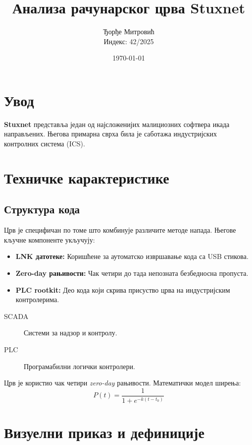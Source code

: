\documentclass[12pt]{article}
\title{Анализа рачунарског црва Stuxnet}
\author{Ђорђе Митровић \\ Индекс: 42/2025}
\date{\today}
\begin{document}
\maketitle

\tableofcontents
\newpage

\section{Увод}
\textbf{Stuxnet} представља један од најсложенијих малициозних софтвера икада направљених. Његова примарна сврха била је саботажа индустријских контролних система (ICS). 


\section{Техничке карактеристике}
\subsection{Структура кода}

Црв је специфичан по томе што комбинује различите методе напада. Његове кључне компоненте укључују:

\begin{itemize}
    \item \textbf{LNK датотеке:} Коришћене за аутоматско извршавање кода са USB стикова.
    \item \textbf{Zero-day рањивости:} Чак четири до тада непозната безбедносна пропуста.
    \item \textbf{PLC rootkit:} Део кода који скрива присуство црва на индустријским контролерима.
\end{itemize}
\begin{description}
    \item[SCADA] Системи за надзор и контролу.
    \item[PLC] Програмабилни логички контролери.
\end{description}
Црв је користио чак четири \textit{zero-day} рањивости. Математички модел ширења:
\begin{equation}
P(t) = \frac{1}{1 + e^{-k(t-t_0)}}
\end{equation}

\section{Визуелни приказ и дефиниције}
\end{document}
